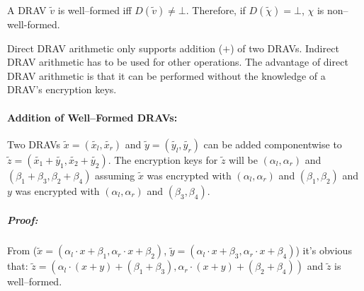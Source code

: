 
A DRAV $\widetilde{v}$ is well--formed iff $D(\widetilde{v}) \neq \bot$.
Therefore, if $D(\widetilde{\chi}) = \bot$, $\chi$ is non--well-formed.


\label{sec:direct-DRAV-arithmetic}

Direct DRAV arithmetic only supports addition ($+$) of two DRAVs. Indirect DRAV
arithmetic has to be used for other operations. The advantage of direct DRAV
arithmetic is that it can be performed without the knowledge of a DRAV's
encryption keys.

\paragraph{Addition of Well--Formed DRAVs:} Two DRAVs $\widetilde{x} =
(\widetilde{x_l}, \widetilde{x_r})$ and $\widetilde{y} = (\widetilde{y_l},
\widetilde{y_r})$ can be added componentwise to $\widetilde{z} =
\left(\widetilde{x_1} + \widetilde{y_1}, \widetilde{x_2} +
\widetilde{y_2}\right)$. The encryption keys for $\widetilde{z}$ will be
$(\alpha_l, \alpha_r)$ and $(\beta_1 + \beta_3, \beta_2 + \beta_4)$ assuming
$\widetilde{x}$ was encrypted with $(\alpha_l, \alpha_r)$ and $(\beta_1,
\beta_2)$ and $y$ was encrypted with $(\alpha_l, \alpha_r)$ and $(\beta_3,
\beta_4)$.

\subparagraph{Proof:} From ($\widetilde{x} = \left(\alpha_l \cdot x + \beta_1,
\alpha_r \cdot x + \beta_2\right)$, $\widetilde{y} = \left(\alpha_l \cdot x +
\beta_3, \alpha_r \cdot x + \beta_4\right)$) it's obvious that: $\widetilde{z} =
\left(\alpha_l \cdot (x+y) + (\beta_1 + \beta_3), \alpha_r \cdot (x+y) +
(\beta_2 + \beta_4)\right)$ and $\widetilde{z}$ is well--formed.

